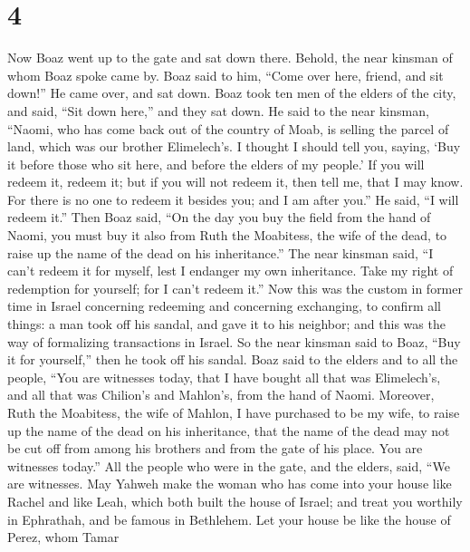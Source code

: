 \hypertarget{section-3}{%
\section{4}\label{section-3}}

 Now Boaz went up to the gate and sat down there. Behold,
the near kinsman of whom Boaz spoke came by. Boaz said to him, ``Come
over here, friend, and sit down!'' He came over, and sat down.
 Boaz took ten men of the elders of the city, and said,
``Sit down here,'' and they sat down.  He said to the near
kinsman, ``Naomi, who has come back out of the country of Moab, is
selling the parcel of land, which was our brother Elimelech's.
 I thought I should tell you, saying, `Buy it before those
who sit here, and before the elders of my people.' If you will redeem
it, redeem it; but if you will not redeem it, then tell me, that I may
know. For there is no one to redeem it besides you; and I am after
you.'' He said, ``I will redeem it.''  Then Boaz said,
``On the day you buy the field from the hand of Naomi, you must buy it
also from Ruth the Moabitess, the wife of the dead, to raise up the name
of the dead on his inheritance.''  The near kinsman said,
``I can't redeem it for myself, lest I endanger my own inheritance. Take
my right of redemption for yourself; for I can't redeem it.''
 Now this was the custom in former time in Israel
concerning redeeming and concerning exchanging, to confirm all things: a
man took off his sandal, and gave it to his neighbor; and this was the
way of formalizing transactions in Israel.  So the near
kinsman said to Boaz, ``Buy it for yourself,'' then he took off his
sandal.  Boaz said to the elders and to all the people,
``You are witnesses today, that I have bought all that was Elimelech's,
and all that was Chilion's and Mahlon's, from the hand of Naomi.
 Moreover, Ruth the Moabitess, the wife of Mahlon, I have
purchased to be my wife, to raise up the name of the dead on his
inheritance, that the name of the dead may not be cut off from among his
brothers and from the gate of his place. You are witnesses today.''
 All the people who were in the gate, and the elders,
said, ``We are witnesses. May Yahweh make the woman who has come into
your house like Rachel and like Leah, which both built the house of
Israel; and treat you worthily in Ephrathah, and be famous in Bethlehem.
 Let your house be like the house of Perez, whom Tamar
